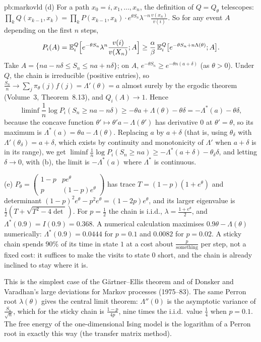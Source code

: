 \begin{solution}{pb:markovld}
(d) For a path $x_0=i,x_1,\dots,x_n$, the definition of $Q=Q_\theta$ telescopes: $\prod_kQ(x_{k-1},x_k)=\prod_kP(x_{k-1},x_k)\cdot e^{\theta S_n}\lambda^{-n}\frac{v(x_n)}{v(i)}$. So for
any event $A$ depending on the first $n$ steps,
\[
P_i(A)=\mathbb E^Q_i\Bigl[e^{-\theta S_n}\lambda^n\frac{v(i)}{v(X_n)};A\Bigr]\ge\frac\alpha\beta\,\mathbb E^Q_i\bigl[e^{-\theta S_n+n\Lambda(\theta)};A\bigr].
\]
Take $A=\{na-n\delta\le S_n\le na+n\delta\}$; on $A$, $e^{-\theta S_n}\ge e^{-\theta n(a+\delta)}$ (as $\theta>0$). Under $Q$, the chain is irreducible (positive entries), so
$\frac{S_n}n\to\sum_j\pi_\theta(j)f(j)=\Lambda'(\theta)=a$ almost surely by the ergodic theorem (Volume~3, Theorem~8.13), and $Q_i(A)\to1$. Hence
\[
\liminf\frac1n\log P_i(S_n\ge na-n\delta)\ge-\theta a+\Lambda(\theta)-\theta\delta=-\Lambda^*(a)-\theta\delta,
\]
because the concave function $\theta'\mapsto\theta'a-\Lambda(\theta')$ has derivative $0$ at $\theta'=\theta$, so its maximum is $\Lambda^*(a)=\theta a-\Lambda(\theta)$. Replacing $a$ by
$a+\delta$ (that is, using $\theta_\delta$ with $\Lambda'(\theta_\delta)=a+\delta$, which exists by continuity and monotonicity of $\Lambda'$ when $a+\delta$ is in its range), we get
$\liminf\frac1n\log P_i(S_n\ge na)\ge-\Lambda^*(a+\delta)-\theta_\delta\delta$, and letting $\delta\to0$, with (b), the limit is $-\Lambda^*(a)$ where $\Lambda^*$ is continuous.

(e) $P_\theta=\begin{pmatrix}1-p&pe^\theta\\p&(1-p)e^\theta\end{pmatrix}$ has trace $T=(1-p)(1+e^\theta)$ and determinant $(1-p)^2e^\theta-p^2e^\theta=(1-2p)e^\theta$, and its larger
eigenvalue is $\frac12(T+\sqrt{T^2-4\det})$. For $p=\frac12$ the chain is i.i.d., $\lambda=\frac{1+e^\theta}2$, and $\Lambda^*(0.9)=I(0.9)=0.368$. A numerical calculation maximises
$0.9\theta-\Lambda(\theta)$ numerically: $\Lambda^*(0.9)=0.0444$ for $p=0.1$ and $0.0082$ for $p=0.02$. A sticky chain spends $90\%$ of its time in state $1$ at a cost about
$\frac{p}{\text{something}}$ per step, not a fixed cost: it suffices to make the visits to state $0$ short, and the chain is already inclined to stay where it is.

\leads This is the simplest case of the G\"artner--Ellis theorem and of Donsker and Varadhan's large deviations for Markov processes (1975--83). The same Perron root
$\lambda(\theta)$ gives the central limit theorem: $\Lambda''(0)$ is the asymptotic variance of $\frac{S_n}{\sqrt n}$, which for the sticky chain is $\frac{1-p}{4p}$, nine times the
i.i.d.\ value $\frac14$ when $p=0.1$. The free energy of the one-dimensional Ising model is the logarithm of a Perron root in exactly this way (the transfer matrix method).
\end{solution}

